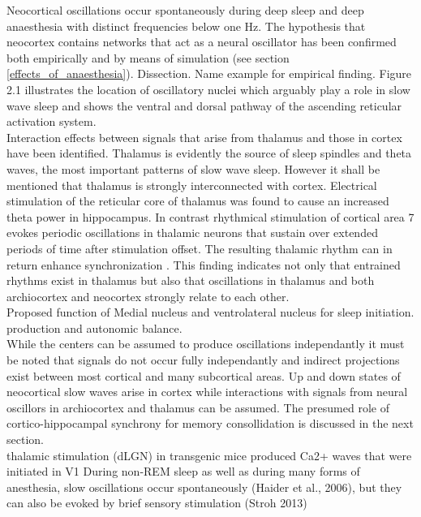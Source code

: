 Neocortical oscillations occur spontaneously during deep sleep and deep anaesthesia with distinct frequencies below one Hz. The hypothesis that neocortex contains networks that act as a neural oscillator has been confirmed both empirically and by means of simulation (see section \ref{effects_of_anaesthesia}). Dissection. Name example for empirical finding. Figure 2.1 illustrates the location of oscillatory nuclei which arguably play a role in slow wave sleep and shows the ventral and dorsal pathway of the ascending reticular activation system. \\
Interaction effects between signals that arise from thalamus and those in cortex have been identified. Thalamus is evidently the source of sleep spindles and theta waves, the most important patterns of slow wave sleep. However it shall be mentioned that thalamus is strongly interconnected with cortex. Electrical stimulation of the reticular core of thalamus was found to cause an increased theta power in hippocampus. In contrast rhythmical stimulation of cortical area 7 evokes periodic oscillations in thalamic neurons that sustain over extended periods of time after stimulation offset. The resulting thalamic rhythm can in return enhance synchronization \parencite[p. 21]{steriade1984thalamus}. This finding indicates not only that entrained rhythms exist in thalamus but also that oscillations in thalamus and both archiocortex and neocortex strongly relate to each other.\\
Proposed function of Medial nucleus and ventrolateral nucleus for sleep initiation. production and autonomic balance.\\

While the centers can be assumed to produce oscillations independantly it must be noted that signals do not occur fully independantly and indirect projections exist between most cortical and many subcortical areas. Up and down states of neocortical slow waves arise in cortex while interactions with signals from neural oscillors in archiocortex and thalamus can be assumed. The presumed role of cortico-hippocampal synchrony for memory consollidation is discussed in the next section.\\

thalamic stimulation (dLGN) in transgenic mice produced Ca2+ waves that were initiated in V1
During non-REM sleep as well as during many forms of anesthesia, slow oscillations occur spontaneously (Haider et al., 2006), but they can also be evoked by brief sensory stimulation (Stroh 2013)

